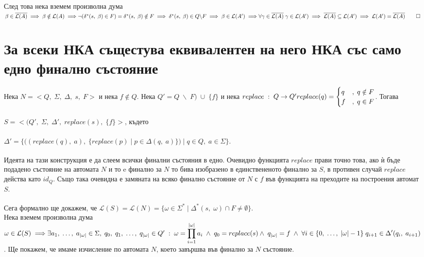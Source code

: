 \documentclass[a4paper, 12pt, oneside]{article}
\newcommand{\Lang}{\mathcal{L}}
\begin{document}
След това нека вземем произволна дума $\beta \in \overline{\Lang(A)} \implies \beta \notin \Lang(A) \implies \\\\
\lnot(\delta^*(s, \; \beta) \in F) = \delta^*(s, \; \beta) \notin F \implies \delta^*(s, \; \beta) \in Q \backslash F \implies \beta \in \Lang(A') \implies \\\\
\forall \gamma \in \overline{\Lang(A)} \; \gamma \in \Lang(A') \implies \overline{\Lang(A)} \subseteq \Lang(A') \implies \Lang(A') = \overline{\Lang(A)} \qed$

\section{За всеки НКА същестува еквивалентен на него НКА със само едно финално състояние}

Нека $N = <Q, \; \Sigma, \; \Delta, \; s, \; F>$ и нека $f \notin Q$. Нека $Q' = Q \; \backslash \; F) \; \cup \; \{f\}$  и нека
$replace \; : \; Q \to Q' \\
replace(q) = \begin{cases}
    q & , \; q \notin F \\
    f & , \; q \in F
\end{cases}$. Тогава \\\\
$S = <(Q', \; \Sigma, \; \Delta', \; replace(s), \; \{f\}>$, където \\\\ 
$\Delta' = \{((replace(q), \; a), \; \{replace(p) \; | \; p \in \Delta(q, \; a)\}) \; | \; q \in Q, \; a \in \Sigma\}$. \\\\

Идеята на тази конструкция е да слеем всички финални състояния в едно. Очевидно функцията $replace$ прави точно това,
ако ѝ бъде подадено състояние на автомата $N$ и то e финално за $N$ то бива изобразено в единствененото финално за $S$,
в противен случай $replace$ действа като $id_Q$. Също така очевидна е замяната на всяко финално състояние от $N$ с $f$
във функцията на преходите на построения автомат $S$. \\\\

Сега формално ще докажем, че $\Lang(S) = \Lang(N) = \{\omega \in \Sigma^* \; | \; \Delta^*(s, \; \omega) \cap F \neq \emptyset\}$. \\

Нека вземем произволна дума $\omega \in \Lang(S) \implies \\\\
\exists a_1, \; \dots, \; a_{|\omega|} \in \Sigma, \; q_0, \; q_1, \; \dots, \; q_{|\omega|} \in Q' \; : \;
\omega = \displaystyle\prod_{i = 1}^{|\omega|} a_i \; \land \; q_0 = replace(s) \\\\
\land \; q_{|\omega|} = f \; \land \; \forall i \in \{0, \; \dots, \; |\omega| - 1\} \; q_{i + 1} \in \Delta'(q_i, \; a_{i + 1})$.
Ще покажем, че имаме изчисление по автомата $N$, което завършва във финално за $N$ състояние. \\\\
\end{document}
